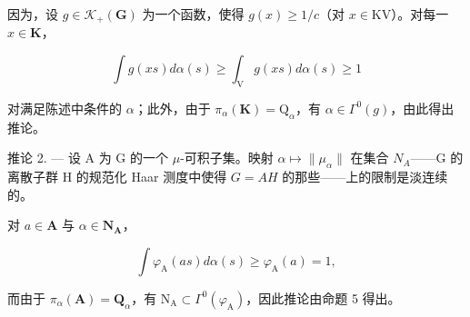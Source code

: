 因为，设 \(g \in \mathcal{K}_{+}(\mathbf{G})\) 为一个函数，使得 \(g(x) \geqslant 1 / c\)（对 \(x \in \mathrm{KV}\)）。对每一 \(x \in \mathbf{K}\)，

\[
\int g (x s) d \alpha (s) \geqslant \int_ {\mathrm{V}} g (x s) d \alpha (s) \geqslant 1
\]

对满足陈述中条件的 \(\alpha\)；此外，由于 \(\pi_{\alpha}(\mathbf{K}) = \mathrm{Q}_{\alpha}\)，有 \(\alpha \in \Gamma^0(g)\)，由此得出推论。

推论 2. --- 设 A 为 G 的一个 \(\mu\)-可积子集。映射 \(\alpha \mapsto \|\mu_{\alpha}\|\) 在集合 \(N_A\)——G 的离散子群 H 的规范化 Haar 测度中使得 \(G = AH\) 的那些——上的限制是淡连续的。

对 \(a \in \mathbf{A}\) 与 \(\alpha \in \mathbf{N}_{\mathbf{A}}\)，

\[
\int \varphi_ {\mathrm{A}} (a s) d \alpha (s) \geqslant \varphi_ {\mathrm{A}} (a) = 1,
\]

而由于 \(\pi_{\alpha}(\mathbf{A}) = \mathbf{Q}_{\alpha}\)，有 \(\mathrm{N}_{\mathrm{A}} \subset \Gamma^{0}(\varphi_{\mathrm{A}})\)，因此推论由命题 5 得出。

